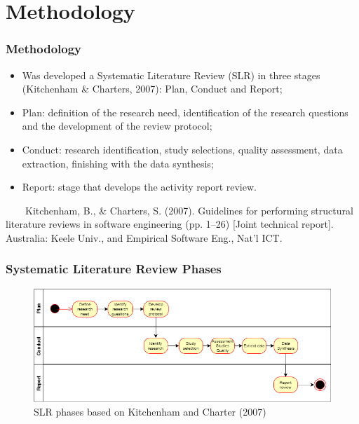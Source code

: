 \documentclass[10pt]{beamer}
\begin{document}
\section{Methodology}

\begin{frame}
	\frametitle{Methodology}
	\begin{itemize}
		\item Was developed a Systematic Literature Review (SLR) in three stages \footnotesize(Kitchenham \& Charters, 2007)\normalsize: Plan, Conduct and Report;
		\item Plan: definition of the research need, identification of the research questions and the development of the review protocol;
		\item Conduct: research identification, study selections, quality assessment, data extraction, finishing with the data synthesis;
		\item Report: stage that develops the activity report review.
	\end{itemize}
	\tiny 
	~~~~Kitchenham, B., \& Charters, S. (2007). Guidelines for performing structural literature reviews in software engineering (pp. 1–26) [Joint technical report]. Australia: Keele Univ., and Empirical Software Eng., Nat’l ICT.\\

\end{frame}

\begin{frame}
	\frametitle{Systematic Literature Review Phases}
	\begin{figure}
		\includegraphics[scale=0.5]{../img/slr_phases.png}
		\caption{SLR phases based on Kitchenham and Charter (2007)}
		\label{figure1}
	\end{figure}
\end{frame}
\end{document}
